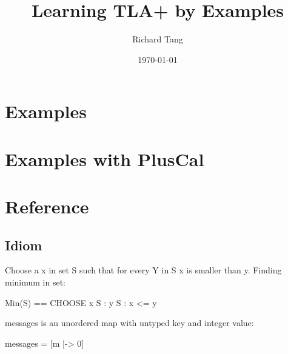 \documentclass{report}
\title{Learning TLA+ by Examples}
\author{Richard Tang}
\date{\today}
\begin{document}
\maketitle
\tableofcontents





\part{Examples}











\part{Examples with PlusCal}





\part{Reference}

\chapter{Idiom}

Choose a x in set S such that for every Y in S x is smaller than y.
Finding minimum in set:\newline
\begin{tla}
    Min(S) == CHOOSE x \in S : \A y \in S : x <= y
\end{tla}
\begin{tlatex}
\end{tlatex}
\newline

messages is an unordered map with untyped key and integer value:\newline

\begin{tla}
messages = [m \in {} |-> 0]
\end{tla}
\begin{tlatex}
%
\end{tlatex}
\end{document}
